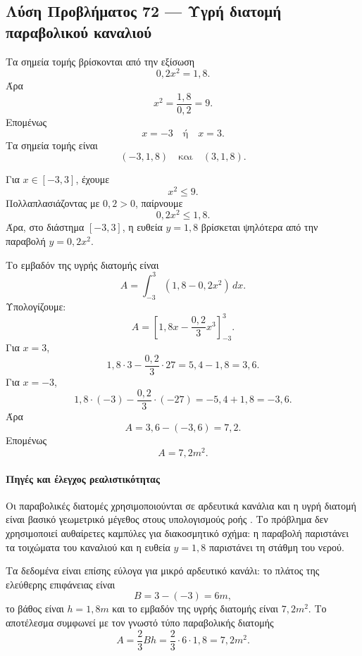 \subsection*{Λύση Προβλήματος 72 --- Υγρή διατομή παραβολικού καναλιού}

\begin{alist}
  \item Τα σημεία τομής βρίσκονται από την εξίσωση
        \[
          0{,}2x^2=1{,}8.
        \]
        Άρα
        \[
          x^2=\frac{1{,}8}{0{,}2}=9.
        \]
        Επομένως
        \[
          x=-3
          \quad\text{ή}\quad
          x=3.
        \]
        Τα σημεία τομής είναι
        \[
          {(-3,1{,}8)}
          \quad\text{και}\quad
          {(3,1{,}8)}.
        \]

  \item Για \(x\in[-3,3]\), έχουμε
        \[
          x^2\leq9.
        \]
        Πολλαπλασιάζοντας με \(0{,}2>0\), παίρνουμε
        \[
          0{,}2x^2\leq1{,}8.
        \]
        Άρα, στο διάστημα \([-3,3]\), η ευθεία \(y=1{,}8\) βρίσκεται
        ψηλότερα από την παραβολή \(y=0{,}2x^2\).

  \item Το εμβαδόν της υγρής διατομής είναι
        \[
          A=\int_{-3}^{3}\left(1{,}8-0{,}2x^2\right)\,dx.
        \]
        Υπολογίζουμε:
        \[
          A=
          \left[
            1{,}8x-\frac{0{,}2}{3}x^3
          \right]_{-3}^{3}.
        \]
        Για \(x=3\),
        \[
          1{,}8\cdot3-\frac{0{,}2}{3}\cdot27
          =
          5{,}4-1{,}8
          =
          3{,}6.
        \]
        Για \(x=-3\),
        \[
          1{,}8\cdot(-3)-\frac{0{,}2}{3}\cdot(-27)
          =
          -5{,}4+1{,}8
          =
          -3{,}6.
        \]
        Άρα
        \[
          A=3{,}6-(-3{,}6)=7{,}2.
        \]
        Επομένως
        \[
          {A=7{,}2\si{m^2}}.
        \]
\end{alist}

\paragraph{Πηγές και έλεγχος ρεαλιστικότητας}
Οι παραβολικές διατομές χρησιμοποιούνται σε αρδευτικά κανάλια και η
υγρή διατομή είναι βασικό γεωμετρικό μέγεθος στους υπολογισμούς ροής
\cite{zhang2013curvedCanals}. Το πρόβλημα δεν χρησιμοποιεί αυθαίρετες
καμπύλες για διακοσμητικό σχήμα: η παραβολή παριστάνει τα τοιχώματα του
καναλιού και η ευθεία \(y=1{,}8\) παριστάνει τη στάθμη του νερού.

Τα δεδομένα είναι επίσης εύλογα για μικρό αρδευτικό κανάλι: το πλάτος
της ελεύθερης επιφάνειας είναι
\[
  B=3-(-3)=6\si{m},
\]
το βάθος είναι \(h=1{,}8\si{m}\) και το εμβαδόν της υγρής διατομής
είναι \(7{,}2\si{m^2}\). Το αποτέλεσμα συμφωνεί με τον γνωστό τύπο
παραβολικής διατομής
\[
  A=\frac{2}{3}Bh
  =
  \frac{2}{3}\cdot6\cdot1{,}8
  =
  7{,}2\si{m^2}.
\]

